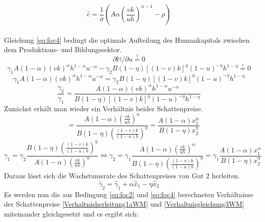 \begin{equation}
\boxed{
\hat{c}=\frac{1}{\sigma}\left(A\alpha \left(\frac{vk}{uh}\right)^{\alpha -1}-\rho\right)}\label{eq:KRR}
\end{equation}\\
Gleichung \eqref{eq:foc4} bedingt die optimale Aufteilung des Humankapitals zwischen dem Produktions- und Bildungssektor. 
\begin{equation*}
\partial\mathbb{H}/\partial u\overset{!}{=}0
\end{equation*}
\begin{equation}
\gamma_1A(1-\alpha)(vk)^{\alpha}h^{1-\alpha}u^{-\alpha}-\gamma_2B(1-\eta)[(1-v)k]^\eta (1-u)^{-\eta} h^{1-\eta}\overset{!}{=}0
\end{equation}
\vspace{-0.5cm}
\begin{equation}
\gamma_1A(1-\alpha)(vk)^{\alpha}h^{1-\alpha}u^{-\alpha}=\gamma_2B(1-\eta)[(1-v)k]^\eta (1-u)^{-\eta} h^{1-\eta}\label{foc4}
\end{equation}
\begin{equation}
\frac{\gamma_2}{\gamma_1}=\frac{A(1-\alpha)(vk)^{\alpha}h^{1-\alpha}u^{-\alpha}}{B(1-\eta)[(1-v)k]^\eta (1-u)^{-\eta} h^{1-\eta}}
\end{equation}
Zunächst erhält man wieder ein Verhältnis beider Schattenpreise. 
\begin{equation}
\quad~=\frac{A(1-\alpha)\left(\frac{vk}{uh}\right)^{\alpha}}{B(1-\eta)\left(\frac{(1-v)k}{(1-u)h}\right)^\eta}=\frac{A(1-\alpha)x_1^{\alpha}}{B(1-\eta)x_2^\eta}\label{Verhaltnisgleichung3WM}
\end{equation}
\begin{equation}
\gamma_1=\gamma_2\frac{B(1-\eta)\left(\frac{(1-v)k}{(1-u)h}\right)^\eta}{A(1-\alpha)\left(\frac{vk}{uh}\right)^{\alpha}}\Longleftrightarrow \gamma_2=\gamma_1 \frac {A(1-\alpha)\left(\frac{vk}{uh}\right)^{\alpha}}{B(1-\eta)\left(\frac{(1-v)k}{(1-u)h}\right)^\eta} = \gamma_1 \frac {A(1-\alpha)x_1^{\alpha}}{B(1-\eta)x_2^\eta}\label{Verhaltnisgleichung3bWM}
\end{equation}
Daraus lässt sich die Wachstumsrate des Schattenpreises von Gut 2 herleiten.
\begin{equation}
\hat{\gamma}_{2} = \hat{\gamma}_{1}+\alpha\hat{x}_1-\eta\hat{x}_2 \label{WachstumGamma2WM}
\end{equation}
Es werden nun die aus Bedingung \eqref{eq:foc2} und \eqref{eq:foc4} berechneten Verhältnisse der Schattenpreise \eqref{Verhaltnisherleitung1aWM} und \eqref{Verhaltnisgleichung3WM} miteinander gleichgesetzt und es ergibt sich: 
